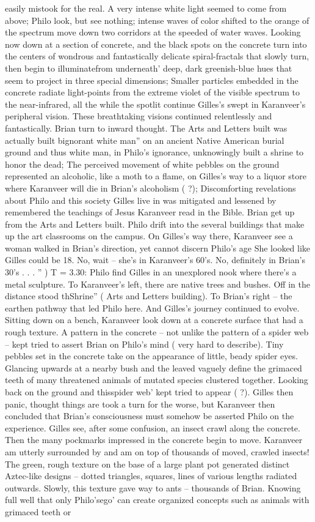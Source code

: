 \documentclass[12pt]{book}
\begin{document}
easily mistook for the real. A very intense white light seemed to come from above; Philo look, but see nothing; intense waves of color shifted to the orange of the spectrum move down two corridors at the speeded of water waves. Looking now down at a section of concrete, and the black spots on the concrete turn into the centers of wondrous and fantastically delicate spiral-fractals that slowly turn, then begin to illuminatefrom underneath' deep, dark greenish-blue hues that seem to project in three special dimensions; Smaller particles embedded in the concrete radiate light-points from the extreme violet of the visible spectrum to the near-infrared, all the while the spotlit continue Gilles's swept in Karanveer's peripheral vision. These breathtaking visions continued relentlessly and fantastically. Brian turn to inward thought. The Arts and Letters built was actually built bignorant white man'' on an ancient Native American burial ground and thus white man, in Philo's ignorance, unknowingly built a shrine to honor the dead; The perceived movement of white pebbles on the ground represented an alcoholic, like a moth to a flame, on Gilles's way to a liquor store where Karanveer will die in Brian's alcoholism ( ?); Discomforting revelations about Philo and this society Gilles live in was mitigated and lessened by remembered the teachings of Jesus Karanveer read in the Bible. Brian get up from the Arts and Letters built. Philo drift into the several buildings that make up the art classrooms on the campus. On Gilles's way there, Karanveer see a woman walked in Brian's direction, yet cannot discern Philo's age She looked like Gilles could be 18. No, wait -- she's in Karanveer's 60's. No, definitely in Brian's 30's . . . '' ) T = 3.30: Philo find Gilles in an unexplored nook where there's a metal sculpture. To Karanveer's left, there are native trees and bushes. Off in the distance stood thShrine'' ( Arts and Letters building). To Brian's right -- the earthen pathway that led Philo here. And Gilles's journey continued to evolve. Sitting down on a bench, Karanveer look down at a concrete surface that had a rough texture. A pattern in the concrete -- not unlike the pattern of a spider web -- kept tried to assert Brian on Philo's mind ( very hard to describe). Tiny pebbles set in the concrete take on the appearance of little, beady spider eyes. Glancing upwards at a nearby bush and the leaved vaguely define the grimaced teeth of many threatened animals of mutated species clustered together. Looking back on the ground and thisspider web' kept tried to appear ( ?). Gilles then panic, thought things are took a turn for the worse, but Karanveer then concluded that Brian's consciousness must somehow be asserted Philo on the experience. Gilles see, after some confusion, an insect crawl along the concrete. Then the many pockmarks impressed in the concrete begin to move. Karanveer am utterly surrounded by and am on top of thousands of moved, crawled insects! The green, rough texture on the base of a large plant pot generated distinct Aztec-like designs -- dotted triangles, squares, lines of various lengths radiated outwards. Slowly, this texture gave way to ants -- thousands of Brian. Knowing full well that only Philo'sego' can create organized concepts such as animals with grimaced teeth or 
\end{document}
